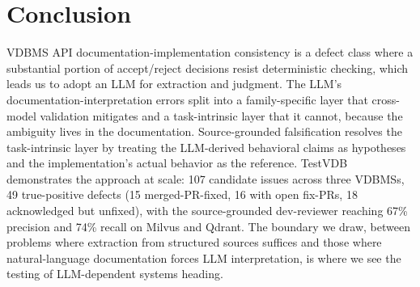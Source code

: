 \documentclass[sigconf]{acmart}
\begin{document}
\section{Conclusion}

VDBMS API documentation-implementation consistency is a defect class where a substantial portion of accept/reject decisions resist deterministic checking, which leads us to adopt an LLM for extraction and judgment. The LLM's documentation-interpretation errors split into a family-specific layer that cross-model validation mitigates and a task-intrinsic layer that it cannot, because the ambiguity lives in the documentation. Source-grounded falsification resolves the task-intrinsic layer by treating the LLM-derived behavioral claims as hypotheses and the implementation's actual behavior as the reference. TestVDB demonstrates the approach at scale: 107 candidate issues across three VDBMSs, 49 true-positive defects (15 merged-PR-fixed, 16 with open fix-PRs, 18 acknowledged but unfixed), with the source-grounded dev-reviewer reaching 67\% precision and 74\% recall on Milvus and Qdrant. The boundary we draw, between problems where extraction from structured sources suffices and those where natural-language documentation forces LLM interpretation, is where we see the testing of LLM-dependent systems heading.



\end{document}
